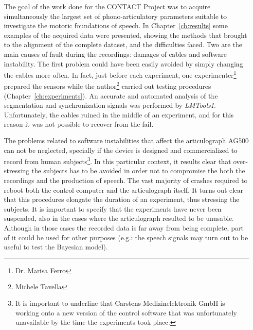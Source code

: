 The goal of the work done for the CONTACT Project was to acquire simultaneously
the largest set of phono-articulatory parameters suitable to investigate the
motoric foundations of speech.
In Chapter~\ref{ch:results} some examples of the 
acquired data were presented, showing
 the methods that brought to the alignment of the 
complete dataset, and the difficulties faced.
Two are the main causes of fault during the recordings: damages of cables and 
software instability.
The first problem could have been easily avoided by simply changing the cables
more often. 
In fact, just before each experiment, one experimenter\footnote{Dr. Marisa
Ferro} prepared the sensors while the author\footnote{Michele Tavella} 
carried out testing procedures
(Chapter~\ref{ch:experiments}).
An accurate and automated analysis of the segmentation and synchronization 
signals was performed by \emph{LMTools1}.
Unfortunately, the cables ruined in the middle of an experiment, and for this
reason it was not possible to recover from the fail.


The problems related to software instabilities that affect the articulograph 
AG500  can not be neglected, specially if the device is designed and 
commercialized to record from human subjects\footnote{It is important to
underline that Carstens Medizinelektronik GmbH is working onto a new version of
the control software that was unfortunately unavailable by the time the
experiments took place.}.
In this particular context, it results clear that over-stressing the subjects
has to be avoided in order not to compromise the both the recordings and the
production of speech.
The vast majority of crashes required to reboot both the control computer and
the articulograph itself. 
It turns out clear that this procedures elongate the duration of an experiment,
thus stressing the subjects.
It is important to specify that the experiments have never been suspended, also
in the cases where the articulograph resulted to be unusable.
Although in those cases the recorded data is far away from being complete, 
part of it could be used for other purposes (e.g.: the speech signals may turn
out to be useful to test the Bayesian model).

